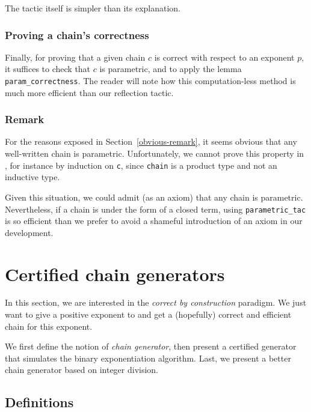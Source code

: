 The tactic itself is simpler than its explanation. 


\subsubsection{Proving a chain's correctness}
\label{C87-param-ok}
Finally, for proving that a given chain $c$ is correct with respect to an exponent $p$, it suffices to check that $c$ is parametric, and
to apply the lemma \texttt{param\_correctness}. 
The reader will note how this computation-less method is much more efficient
than our reflection tactic.


\subsubsection{Remark}
For the reasons exposed in Section~\vref{obvious-remark}, 
it seems obvious that any well-written chain is parametric.
Unfortunately, we cannot prove this property  in \coq{},
for instance by induction on \texttt{c}, 
since \texttt{chain} is a product type and not an inductive type.


Given this situation, we could  admit (as an axiom) that 
any chain is parametric. Nevertheless, if a chain is under the form of a 
closed term, using \texttt{parametric\_tac} is so efficient than we prefer to 
 avoid
a shameful introduction of an axiom in our development.

\section{Certified chain generators}
\label{chain-generation}

In this section, we are interested in the \emph{correct by construction} paradigm.
We just want to give a positive exponent to \coq{} and get a (hopefully)  correct and  efficient chain for this exponent.

We first define the notion of \emph{chain generator}, then present a certified generator that simulates the binary exponentiation algorithm. Last, we present a better chain generator based on integer division.


\subsection{Definitions}

